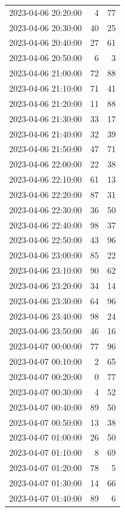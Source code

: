 \documentclass[
  letterpaper,
  DIV=11,
  numbers=noendperiod]{scrartcl}
\begin{document}
\begin{tabular}{lrr}
2023-04-06 20:20:00 &     4 &    77 \\
2023-04-06 20:30:00 &    40 &    25 \\
2023-04-06 20:40:00 &    27 &    61 \\
2023-04-06 20:50:00 &     6 &     3 \\
2023-04-06 21:00:00 &    72 &    88 \\
2023-04-06 21:10:00 &    71 &    41 \\
2023-04-06 21:20:00 &    11 &    88 \\
2023-04-06 21:30:00 &    33 &    17 \\
2023-04-06 21:40:00 &    32 &    39 \\
2023-04-06 21:50:00 &    47 &    71 \\
2023-04-06 22:00:00 &    22 &    38 \\
2023-04-06 22:10:00 &    61 &    13 \\
2023-04-06 22:20:00 &    87 &    31 \\
2023-04-06 22:30:00 &    36 &    50 \\
2023-04-06 22:40:00 &    98 &    37 \\
2023-04-06 22:50:00 &    43 &    96 \\
2023-04-06 23:00:00 &    85 &    22 \\
2023-04-06 23:10:00 &    90 &    62 \\
2023-04-06 23:20:00 &    34 &    14 \\
2023-04-06 23:30:00 &    64 &    96 \\
2023-04-06 23:40:00 &    98 &    24 \\
2023-04-06 23:50:00 &    46 &    16 \\
2023-04-07 00:00:00 &    77 &    96 \\
2023-04-07 00:10:00 &     2 &    65 \\
2023-04-07 00:20:00 &     0 &    77 \\
2023-04-07 00:30:00 &     4 &    52 \\
2023-04-07 00:40:00 &    89 &    50 \\
2023-04-07 00:50:00 &    13 &    38 \\
2023-04-07 01:00:00 &    26 &    50 \\
2023-04-07 01:10:00 &     8 &    69 \\
2023-04-07 01:20:00 &    78 &     5 \\
2023-04-07 01:30:00 &    14 &    66 \\
2023-04-07 01:40:00 &    89 &     6 \\

\end{tabular}
\end{document}
